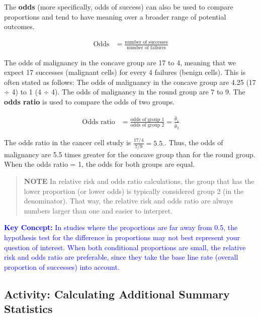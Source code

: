 \documentclass[
]{book}
\begin{document}
The \textbf{odds} (more specifically, odds of success) can also be used to compare proportions and tend to have meaning over a broader range of potential outcomes.

\begin{align}\label{5.5}
\text{Odds} &= \frac{\text{number of successes}}{\text{number of failures}} \tag{5.5}
\end{align}

The odds of malignancy in the concave group are 17 to 4, meaning that we expect 17 successes (malignant cells) for every 4 failures (benign cells). This is often stated as follows: The odds of malignancy in the concave group are 4.25 (17 ÷ 4) to 1 (4 ÷ 4). The odds of malignancy in the round group are 7 to 9. The \textbf{odds ratio} is used to compare the odds of two groups.

\begin{align}\label{5.6}
\text{Odds ratio} &= \frac{\text{odds of group 1}}{\text{odds of group 2}} = \frac{\hat\theta_1}{\hat\theta_2} \tag{5.6}
\end{align}

The odds ratio in the cancer cell study is \(\frac{17/4}{7/9} = 5.5.\). Thus, the odds of malignancy are 5.5 times greater for the concave group than for the round group. When the odds ratio = 1, the odds for both groups are equal.

\begin{quote}
\textbf{NOTE} In relative risk and odds ratio calculations, the group that has the lower proportion (or lower odds) is typically considered group 2 (in the denominator). That way, the relative risk and odds ratio are always numbers larger than one and easier to interpret.
\end{quote}

\textbf{\textcolor{blue}{Key Concept:}}
\textcolor{blue}{In studies where the proportions are far away from 0.5, the hypothesis test for the difference in proportions may not best represent your question of interest. When both conditional proportions are small, the relative risk and odds ratio are preferable, since they take the base line rate (overall proportion of successes) into account.}

\hypertarget{activity-calculating-additional-summary-statistics}{%
\subsection*{Activity: Calculating Additional Summary Statistics}\label{activity-calculating-additional-summary-statistics}}
\end{document}
